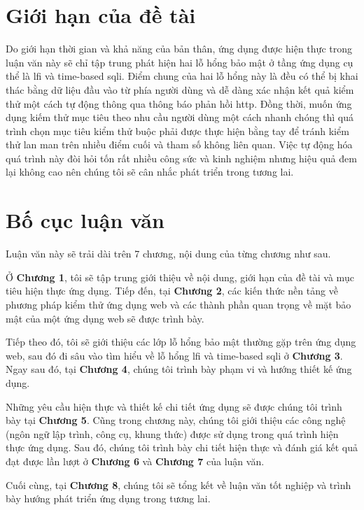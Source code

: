 \section{Giới hạn của đề tài}
Do giới hạn thời gian và khả năng của bản thân, ứng dụng được hiện thực trong luận văn này sẽ chỉ tập trung phát hiện hai lỗ hổng bảo mật ở tầng ứng dụng cụ thể là \acrfull{lfi} và time-based \acrfull{sqli}. Điểm chung của hai lỗ hổng này là đều có thể bị khai thác bằng dữ liệu đầu vào từ phía người dùng và dễ dàng xác nhận kết quả kiểm thử một cách tự động thông qua thông báo phản hồi \acrshort{http}. Đồng thời, muốn ứng dụng kiếm thử mục tiêu theo nhu cầu người dùng một cách nhanh chóng thì quá trình chọn mục tiêu kiểm thử buộc phải được thực hiện bằng tay để tránh kiểm thử lan man trên nhiều điểm cuối và tham số không liên quan. Việc tự động hóa quá trình này đòi hỏi tốn rất nhiều công sức và kinh nghiệm nhưng hiệu quả đem lại không cao nên chúng tôi sẽ cân nhắc phát triển trong tương lai.

\section{Bố cục luận văn}
Luận văn này sẽ trải dài trên 7 chương, nội dung của từng chương như sau. \par
Ở \textbf{Chương 1}, tôi sẽ tập trung giới thiệu về nội dung, giới hạn của đề tài và mục tiêu hiện thực ứng dụng. Tiếp đến, tại \textbf{Chương 2}, các kiến thức nền tảng về phương pháp kiểm thử ứng dụng web và các thành phần quan trọng về mặt bảo mật của một ứng dụng web sẽ được trình bày. \par
Tiếp theo đó, tôi sẽ giới thiệu các lớp lỗ hổng bảo mật thường gặp trên ứng dụng web, sau đó đi sâu vào tìm hiểu về lỗ hổng \acrshort{lfi} và time-based \acrshort{sqli} ở \textbf{Chương 3}. Ngay sau đó, tại \textbf{Chương 4}, chúng tôi trình bày phạm vi và hướng thiết kế ứng dụng.\par
Những yêu cầu hiện thực và thiết kế chi tiết ứng dụng sẽ được chúng tôi trình bày tại \textbf{Chương 5}. Cũng trong chương này, chúng tôi giới thiệu các công nghệ (ngôn ngữ lập trình, công cụ, khung thức) được sử dụng trong quá trình hiện thực ứng dụng. Sau đó, chúng tôi trình bày chi tiết hiện thực và đánh giá kết quả đạt được lần lượt ở \textbf{Chương 6} và \textbf{Chương 7} của luận văn. \par
Cuối cùng, tại \textbf{Chương 8}, chúng tôi sẽ tổng kết về luận văn tốt nghiệp và trình bày hướng phát triển ứng dụng trong tương lai.
